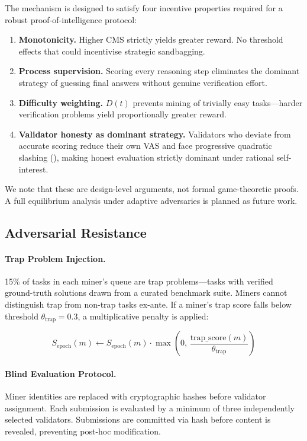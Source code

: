 \documentclass[11pt,a4paper]{article}
\begin{document}
The mechanism is designed to satisfy four incentive properties required
for a robust proof-of-intelligence protocol:

\begin{enumerate}[nosep]
  \item \textbf{Monotonicity.} Higher CMS strictly yields greater
    reward.  No threshold effects that could incentivise strategic
    sandbagging.
  \item \textbf{Process supervision.} Scoring every reasoning step
    eliminates the dominant strategy of guessing final answers without
    genuine verification effort.
  \item \textbf{Difficulty weighting.} $D(t)$ prevents mining of
    trivially easy tasks---harder verification problems yield
    proportionally greater reward.
  \item \textbf{Validator honesty as dominant strategy.} Validators who
    deviate from accurate scoring reduce their own VAS and face
    progressive quadratic slashing (), making
    honest evaluation strictly dominant under rational self-interest.
\end{enumerate}

\noindent We note that these are design-level arguments, not formal
game-theoretic proofs.  A full equilibrium analysis under adaptive
adversaries is planned as future work.

\subsection{Adversarial Resistance}
\label{sec:adversarial}

\paragraph{Trap Problem Injection.}
15\% of tasks in each miner's queue are trap problems---tasks with
verified ground-truth solutions drawn from a curated benchmark suite.
Miners cannot distinguish trap from non-trap tasks ex-ante.  If a miner's
trap score falls below threshold $\theta_{\text{trap}} = 0.3$, a
multiplicative penalty is applied:

\begin{equation}
  S_{\text{epoch}}(m) \leftarrow S_{\text{epoch}}(m)
    \cdot \max\!\left(0,\,
    \frac{\text{trap\_score}(m)}{\theta_{\text{trap}}}\right)
  \label{eq:trap}
\end{equation}

\paragraph{Blind Evaluation Protocol.}
Miner identities are replaced with cryptographic hashes before validator
assignment.  Each submission is evaluated by a minimum of three
independently selected validators.  Submissions are committed via hash
before content is revealed, preventing post-hoc modification.
\end{document}
